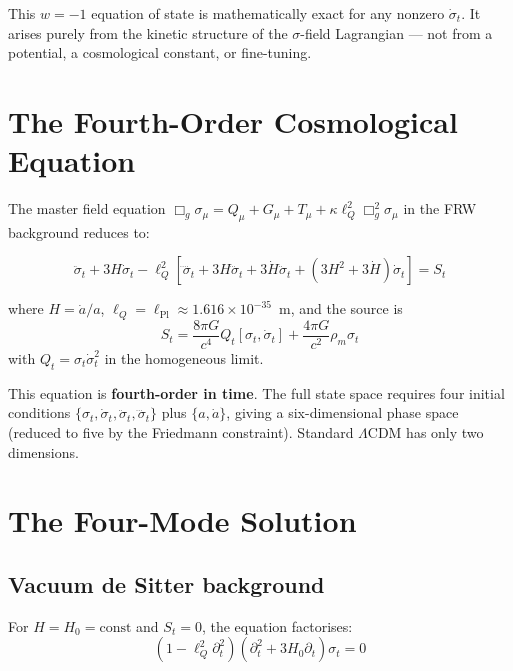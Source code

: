 \documentclass[11pt,a4paper]{article}
\theoremstyle{plain}
\theoremstyle{definition}
\theoremstyle{remark}
\newcommand{\lQ}{\ell_Q}
\begin{document}
This $w = -1$ equation of state is mathematically exact for any nonzero $\dot\sigma_t$.  It arises purely from the kinetic structure of the $\sigma$-field Lagrangian --- not from a potential, a cosmological constant, or fine-tuning.

\section{The Fourth-Order Cosmological Equation}
\label{sec:fourth_order}

The master field equation $\Box_g\sigma_\mu = Q_\mu + G_\mu + T_\mu + \kappa\lQ^2\Box_g^2\sigma_\mu$ in the FRW background reduces to:

\begin{equation}
  \boxed{\ddot\sigma_t + 3H\dot\sigma_t - \lQ^2\!\left[\ddddot\sigma_t + 3H\dddot\sigma_t + 3\dot H\ddot\sigma_t + (3H^2 + 3\dot H)\dot\sigma_t\right] = S_t}
  \label{eq:cosmo_master}
\end{equation}

where $H = \dot a/a$, $\lQ = \ell_{\mathrm{Pl}} \approx 1.616\times10^{-35}$~m, and the source is
\begin{equation}
  S_t = \frac{8\pi G}{c^4}Q_t[\sigma_t,\dot\sigma_t] + \frac{4\pi G}{c^2}\rho_m\sigma_t
\end{equation}
with $Q_t = \sigma_t\dot\sigma_t^2$ in the homogeneous limit.

This equation is \textbf{fourth-order in time}.  The full state space requires four initial conditions $\{\sigma_t, \dot\sigma_t, \ddot\sigma_t, \dddot\sigma_t\}$ plus $\{a, \dot a\}$, giving a six-dimensional phase space (reduced to five by the Friedmann constraint).  Standard $\Lambda$CDM has only two dimensions.

\section{The Four-Mode Solution}
\label{sec:modes}

\subsection{Vacuum de Sitter background}

For $H = H_0 = \mathrm{const}$ and $S_t = 0$, the equation factorises:
\begin{equation}
  (1 - \lQ^2\partial_t^2)(\partial_t^2 + 3H_0\partial_t)\sigma_t = 0
\end{equation}
\end{document}
